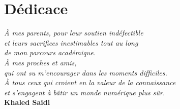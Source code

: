 \chapter*{\Huge Dédicace}
\vspace{8mm}

\begin{flushright}
\large
\textit{À mes parents, pour leur soutien indéfectible}\\
\textit{et leurs sacrifices inestimables tout au long}\\
\textit{de mon parcours académique.}\\[10mm]
\textit{À mes proches et amis,}\\
\textit{qui ont su m'encourager dans les moments difficiles.}\\[10mm]
\textit{À tous ceux qui croient en la valeur de la connaissance}\\
\textit{et s'engagent à bâtir un monde numérique plus sûr.}\\[15mm]
\textbf{Khaled Saidi}
\end{flushright}
